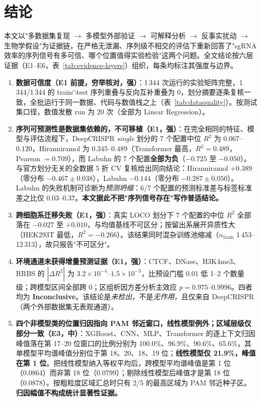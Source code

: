 \section{结论}
\label{sec:conclusion}

本文以"多数据集复现 $\rightarrow$ 多模型外部验证 $\rightarrow$ 可解释分析 $\rightarrow$ 反事实扰动 $\rightarrow$ 生物学假设"为证据链，在严格无泄漏、序列级不相交的评估下重新回答了"sgRNA 效率的序列信号有多可信、哪个位置值得实验检验"这两个问题。全文结论按六层证据（E1--E6，表~\ref{tab:evidence-layers}）组织，每条均标注其强度与边界。

\begin{enumerate}
\item \textbf{数据可信度（E1 前提，穷举核对，强）}：1\,344 次运行的实验矩阵完整，1\,344/1\,344 的 train$\cap$test 序列重叠与反向互补重叠为 0，划分摘要逐条复核一致，全批运行于同一数据、代码与数值栈之上（表~\ref{tab:dataquality}）。按测试集口径，数值发散 run 为 20 次（全部为 Linear Regression）。
\item \textbf{序列可预测性是数据集依赖的，不可移植（E1，强）}：在完全相同的特征、模型与评估流程下，DeepCRISPR \emph{single} 划分的 7 个配置中位 $R^{2}$ 为 $0.067$--$0.120$，Hiranniramol 为 $0.345$--$0.489$（Transformer 最高，$R^{2}=0.489$，Pearson $=0.709$），而 Labuhn 的 7 个配置\textbf{全部为负}（$-0.725$ 至 $-0.050$）。与官方划分无关的全数据 5 折 CV 复核给出同向结论：Hiranniramol $+0.389$（零分布 $-0.467\pm0.038$），Labuhn $-0.144$（零分布 $-0.287\pm0.050$）。Labuhn 的失败机制可诊断为\emph{预测坍缩}：6/7 个配置的预测标准差与标签标准差之比仅 $0.03$--$0.37$。\textbf{本文据此不把"序列信号存在"写作普适结论。}
\item \textbf{跨细胞系迁移失败（E1，强）}：真实 LOCO 划分下 7 个配置的中位 $R^{2}$ 全部落在 $-0.027$ 至 $+0.010$，与均值基线不可区分；按留出系展开异质性大（HEK293T 最低，$R^{2}=-0.266$）。该结果同时混杂训练池缩减（$n_{\text{train}}$ 1\,453--12\,313），故只报告"不可区分"。
\item \textbf{环境通道未获得增量预测证据（E1，强）}：CTCF、DNase、H3K4me3、RRBS 的 $|\overline{\Delta R^{2}}|$ 为 $3.2\times10^{-4}$--$1.5\times10^{-3}$，比预设门槛 $0.01$ 低 1--2 个数量级；跨模型区间全部跨 0；区组析因方差分析主效应 $p=0.975$--$0.9996$。四者均为 \textbf{Inconclusive}。该结论是\emph{未检出}，不是\emph{无作用}，且仅来自 DeepCRISPR（两个外部数据集无表观通道）。
\item \textbf{四个非模型类的位置归因指向 PAM 邻近窗口，线性模型例外；区域层级仅部分一致（E3，中）}：XGBoost、CNN、MLP、Transformer 的逐上下文归因峰值落在第 17--20 位窗口的比例分别为 100.0\%、96.9\%、90.6\%、65.6\%，其单模型平均谱峰值分别位于第 18、20、18、19 位；\textbf{线性模型仅 21.9\%，峰值在第 1 位}。把线性模型纳入等权平均后，跨模型平均谱峰值是第 1 位（0.0864）而非第 18 位（0.0799）；剔除线性模型后峰值才是第 18 位（0.0878）。按粗粒度区域汇总时只有 2/5 的最高区域为 PAM 邻近种子区。\textbf{归因幅值不构成统计显著性证据。}

\end{enumerate}
